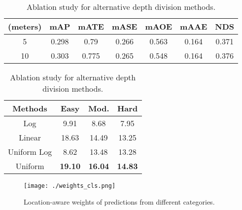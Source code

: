 \begin{table}[htb]
\tiny
\begin{minipage}{.5\linewidth}
    \centering
    \vspace{-1.0ex}
    \caption{Ablation study for the depth unit setting with our lightweight model on nuScenes.}
    \vspace{-1ex}
	\begin{tabular}{c|c|c|c|c|c|c}
	\hline
	 (meters) & mAP & mATE & mASE & mAOE & mAAE & NDS\\
	\hline
	5 & 0.298 & 0.79 & 0.266 & 0.563 & 0.164 & 0.371\\
	10 & 0.303 & 0.775 & 0.265 & 0.548 & 0.164 & 0.376\\
	\hline
	\end{tabular}
	\label{tab: ablation_unit}
    \vspace{-2ex}
\end{minipage}
\hspace{4.5ex}
\begin{minipage}{.45\linewidth}
    \centering
    \vspace{-1.0ex}
    \caption{Ablation study for alternative depth division methods.}
    \vspace{-1.0ex}
    \begin{tabular}{c|c|c|c}
    \hline
     Methods & Easy & Mod. & Hard\\
     \hline
    Log & 9.91 & 8.68 & 7.95\\
    Linear & 18.63 & 14.49 & 13.25\\
    Uniform Log & 8.62 & 13.48 & 13.28\\
    Uniform & \textbf{19.10} & \textbf{16.04} & \textbf{14.83}\\
    \hline
    \end{tabular}
    \label{tab: ablation_div}
    \vspace{-2ex}
\end{minipage}
\end{table}

\begin{figure}
\begin{center}
\texttt{[image: ./weights\_cls.png]}
\end{center}
    \vspace{-3ex}
    \caption{Location-aware weights of predictions from different categories.}
    \vspace{-3ex}
\label{fig: weights_cls}
\end{figure}

